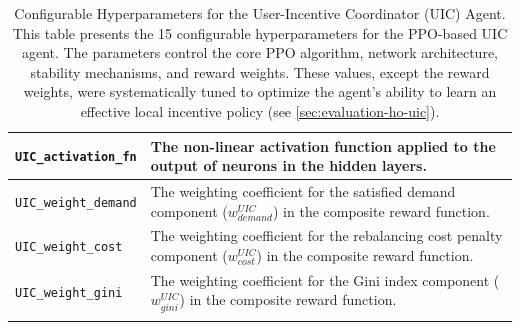 \begin{xltabular}{\textwidth}{lX}
        \texttt{UIC\_activation\_fn}    & The non-linear activation function applied to the output of neurons in the hidden layers. \\
        \midrule
        \texttt{UIC\_weight\_demand}    & The weighting coefficient for the satisfied demand component ($w_{demand}^{UIC}$) in the composite reward function. \\
        \texttt{UIC\_weight\_cost}      & The weighting coefficient for the rebalancing cost penalty component ($w_{cost}^{UIC}$) in the composite reward function. \\
        \texttt{UIC\_weight\_gini}      & The weighting coefficient for the Gini index component ($w_{gini}^{UIC}$) in the composite reward function. \\
        \bottomrule
    \caption{Configurable Hyperparameters for the User-Incentive Coordinator (UIC) Agent. This table presents the 15 configurable hyperparameters for the PPO-based UIC agent. The parameters control the core PPO algorithm, network architecture, stability mechanisms, and reward weights. These values, except the reward weights, were systematically tuned to optimize the agent's ability to learn an effective local incentive policy (see \autoref{sec:evaluation-ho-uic}).}
    \label{tab:uic_hyperparameters_detailed}
\end{xltabular}


